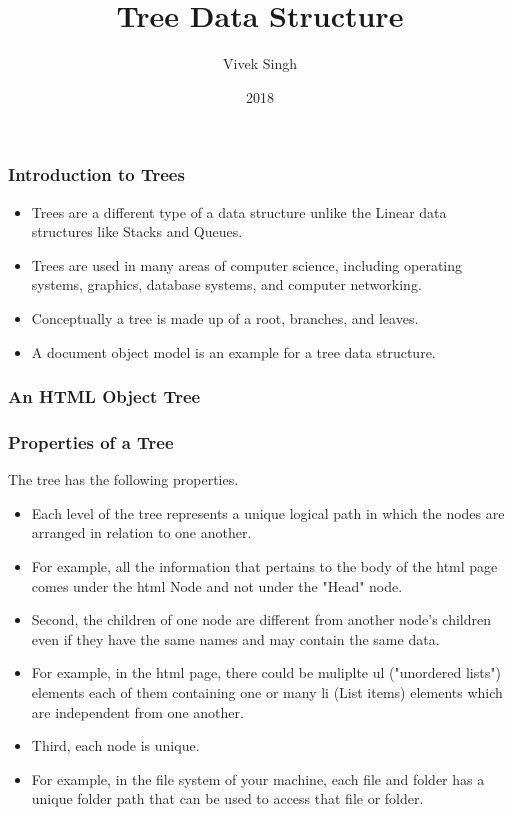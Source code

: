 \documentclass{beamer}
\title{Tree Data Structure}
\author{Vivek Singh}
\institute{Information Systems Decision Sciences (ISDS)\\
MUMA College of Business\\
University of South Florida \\
Tampa, Florida}
\date{2018}
\begin{document}
 
\frame{\titlepage}
 
\begin{frame}
\frametitle{Introduction to Trees}
\begin{itemize}


\item Trees are a different type of a data structure unlike the Linear data structures like Stacks and Queues.

\item Trees are used in many areas of computer science, including operating systems, graphics, database systems, and computer networking.

\item Conceptually a tree is made up of a root, branches, and leaves.

\item A document object model is an example for a tree data structure.
\end{itemize}

\end{frame}

\begin{frame}
\frametitle{An HTML Object Tree}
\end{frame}

\begin{frame}
\frametitle{Properties of a Tree}
The tree has the following properties.
\begin{itemize}
\item Each level of the tree represents a unique logical path in which the nodes are arranged in relation to one another.

\item For example, all the  information that pertains to the body of the html page comes under the html Node and not under the "Head" node.

\item Second, the children of one node are different from another node's children even if they have the same names and may contain the same data.

\item For example, in the html page, there could be muliplte ul ("unordered lists") elements each of them containing one or many li (List items) elements which are independent from one another.

\item Third, each node is unique.

\item For example, in the file system of your machine, each file and folder has a unique folder path that can be used to access that file or folder.
\end{itemize}
\end{frame}
\end{document}
